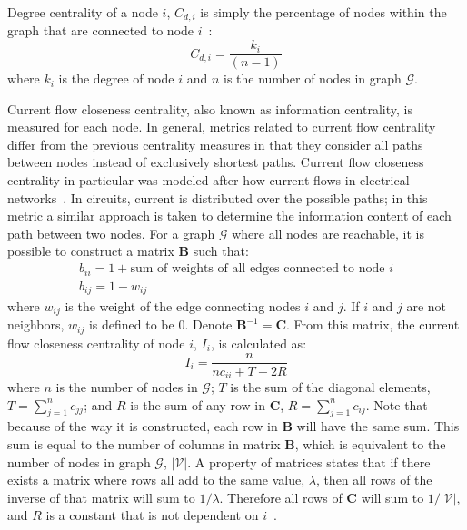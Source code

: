 \documentclass[12pt]{report}
\begin{document}
Degree centrality of a node $i$, $C_{d,i}$ is simply the percentage of nodes within the graph that are connected to node $i$~\cite{borgatti2011analyzing}:
\begin{equation}
C_{d,i} = \frac{k_i}{(n-1)}
\end{equation}
where $k_i$ is the degree of node $i$ and $n$ is the number of nodes in graph $\mathcal{G}$.

Current flow closeness centrality, also known as information centrality, is measured for each node.
In general, metrics related to current flow centrality differ from the previous centrality measures in that they consider all paths between nodes instead of exclusively shortest paths.
Current flow closeness centrality in particular was modeled after how current flows in electrical networks~\cite{brandes2005centrality}.
In circuits, current is distributed over the possible paths; in this metric a similar approach is taken to determine the information content of each path between two nodes.
For a graph $\mathcal{G}$ where all nodes are reachable, it is possible to construct a matrix $\boldsymbol{B}$ such that:
\begin{gather}
b_{ii} = 1 + \text{sum of weights of all edges connected to node } i \\
b_{ij} = 1- w_{ij}
\end{gather}
where $w_{ij}$ is the weight of the edge connecting nodes $i$ and $j$.
If $i$ and $j$ are not neighbors, $w_{ij}$ is defined to be $0$.
Denote $\boldsymbol{B}^{-1} = \boldsymbol{C}$.
From this matrix, the current flow closeness centrality of node $i$, $I_i$, is calculated as:
\begin{equation}
I_i = \frac{n}{nc_{ii}+T-2R}
\end{equation}
where $n$ is the number of nodes in $\mathcal{G}$; $T$ is the sum of the diagonal elements, $T = \sum_{j=1}^nc_{jj}$; and $R$ is the sum of any row in $\boldsymbol{C}$, $R = \sum_{j=1}^nc_{ij}$.
Note that because of the way it is constructed, each row in $\boldsymbol{B}$ will have the same sum.
This sum is equal to the number of columns in matrix $\boldsymbol{B}$, which is equivalent to the number of nodes in graph $\mathcal{G}$, $|\mathcal{V}|$.
A property of matrices states that if there exists a matrix where rows all add to the same value, $\lambda$, then all rows of the inverse of that matrix will sum to $1/\lambda$.
Therefore all rows of $\boldsymbol{C}$ will sum to $1/|\mathcal{V}|$, and $R$ is a constant that is not dependent on $i$~\cite{stephenson1989rethinking}.
\end{document}
